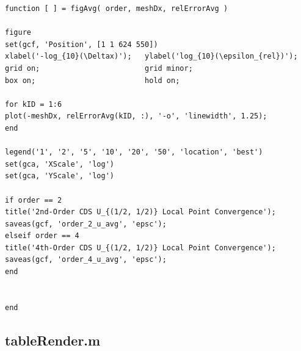 \documentclass[10pt]{article}		%
\numberwithin{equation}{section}
\begin{document}
\begin{lstlisting}
function [ ] = figAvg( order, meshDx, relErrorAvg )

figure
set(gcf, 'Position', [1 1 624 550])
xlabel('-log_{10}(\Deltax)');   ylabel('log_{10}(\epsilon_{rel})');
grid on;                        grid minor;
box on;                         hold on;

for kID = 1:6
plot(-meshDx, relErrorAvg(kID, :), '-o', 'linewidth', 1.25);
end

legend('1', '2', '5', '10', '20', '50', 'location', 'best')
set(gca, 'XScale', 'log')
set(gca, 'YScale', 'log')

if order == 2
title('2nd-Order CDS U_{(1/2, 1/2)} Local Point Convergence');
saveas(gcf, 'order_2_u_avg', 'epsc');
elseif order == 4
title('4th-Order CDS U_{(1/2, 1/2)} Local Point Convergence');
saveas(gcf, 'order_4_u_avg', 'epsc');
end


end
\end{lstlisting}

\subsection{tableRender.m}
\end{document}
